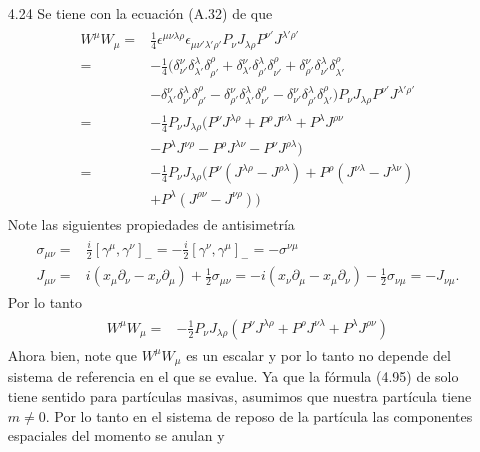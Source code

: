 \documentclass{article}
\begin{document}
\begin{enumerate}
\item[4.24] Se tiene con la ecuación (A.32) de \cite{Lahiri2005} que
\begin{align}
\begin{split}
W^\mu W_\mu=&\frac{1}{4}\epsilon^{\mu\nu\lambda\rho}\epsilon_{\mu\nu'\lambda'\rho'}P_\nu J_{\lambda\rho}P^{\nu'} J^{\lambda'\rho'}\\
=&-\frac{1}{4}(\delta^\nu_{\nu'}\delta^\lambda_{\lambda'}\delta^\rho_{\rho'}+\delta^\nu_{\lambda'}\delta^\lambda_{\rho'}\delta^\rho_{\nu'}+\delta^\nu_{\rho'}\delta^\lambda_{\nu'}\delta^\rho_{\lambda'}\\
&-\delta^\nu_{\lambda'}\delta^\lambda_{\nu'}\delta^\rho_{\rho'}-\delta^\nu_{\rho'}\delta^\lambda_{\lambda'}\delta^\rho_{\nu'}-\delta^\nu_{\nu'}\delta^\lambda_{\rho'}\delta^\rho_{\lambda'})P_\nu J_{\lambda\rho}P^{\nu'} J^{\lambda'\rho'}\\
=&-\frac{1}{4}P_\nu J_{\lambda\rho}(P^{\nu} J^{\lambda\rho}+P^{\rho} J^{\nu\lambda}+P^{\lambda} J^{\rho\nu}\\
&-P^{\lambda} J^{\nu\rho}-P^{\rho} J^{\lambda\nu}-P^{\nu} J^{\rho\lambda})\\
=&-\frac{1}{4}P_\nu J_{\lambda\rho}(P^{\nu} (J^{\lambda\rho}-J^{\rho\lambda})+P^{\rho} (J^{\nu\lambda}-J^{\lambda\nu})\\
&+P^{\lambda} (J^{\rho\nu}-J^{\nu\rho}))
\end{split}
\end{align}
Note las siguientes propiedades de antisimetría
\begin{align}
\begin{split}
\sigma_{\mu\nu}=&\frac{i}{2}[\gamma^\mu,\gamma^\nu]_-=-\frac{i}{2}[\gamma^\nu,\gamma^\mu]_-=-\sigma^{\nu\mu}\\
J_{\mu\nu}=&i(x_\mu\partial_\nu-x_\nu\partial_\mu)+\frac{1}{2}\sigma_{\mu\nu}=-i(x_\nu\partial_\mu-x_\mu\partial_\nu)-\frac{1}{2} \sigma_{\nu\mu}=-J_{\nu\mu}.
\end{split}
\end{align}
Por lo tanto
\begin{align}
\begin{split}
W^\mu W_\mu=&-\frac{1}{2}P_\nu J_{\lambda\rho}(P^{\nu} J^{\lambda\rho}+P^{\rho} J^{\nu\lambda}+P^{\lambda} J^{\rho\nu})
\end{split}
\end{align}
Ahora bien, note que $W^\mu W_\mu$ es un escalar y por lo tanto no depende del sistema de referencia en el que se evalue. Ya que la fórmula (4.95) de \cite{Lahiri2005} solo tiene sentido para partículas masivas, asumimos que nuestra partícula tiene $m\neq 0$. Por lo tanto en el sistema de reposo de la partícula las componentes espaciales del momento se anulan y

\end{enumerate}
\end{document}
